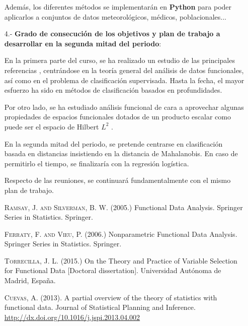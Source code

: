 \documentclass[a4paper,oneside,11pt,leqno]{article}
\begin{document}
\begin{enumerate}
            Además, los diferentes métodos se implementarán en \textbf{Python} para poder aplicarlos a conjuntos de datos meteorológicos,
            médicos, poblacionales...

      \item[4.-] {\bf Grado de consecución de los objetivos y plan de trabajo a desarrollar en la segunda mitad del periodo}:

            En la primera parte del curso, se ha realizado un estudio de las principales referencias \cite{Ramsay-Silverman, Ferraty-Vieu},
            centrándose en la teoría general del análisis de datos funcionales, así como en el problema de clasificación supervisada.
            Hasta la fecha, el mayor esfuerzo ha sido en métodos de clasificación basados en profundidades.

            Por otro lado, se ha estudiado análisis funcional de cara a aprovechar algunas propiedades de espacios funcionales dotados
            de un producto escalar como puede ser el espacio de Hilbert $L^2$ \cite{papa-Rudin}.

            En la segunda mitad del periodo, se pretende centrarse en clasificación basada en distancias insistiendo en
            la distancia de Mahalanobis. En caso de permitirlo el tiempo, se finalizaría con la regresión logística.

            Respecto de las reuniones, se continuará fundamentalmente con el mismo plan de trabajo.

            \begin{thebibliography}{10}

                  \textsc{Ramsay, J. and Silverman, B. W.} (2005.) Functional Data Analysis.
                  Springer Series in Statistics. Springer.

                  \textsc{Ferraty, F. and Vieu, P.} (2006.) Nonparametric Functional Data Analysis.
                  Springer Series in Statistics. Springer.

                  \textsc{Torrecilla, J. L.} (2015.) On the Theory and Practice of Variable
                  Selection for Functional Data [Doctoral dissertation]. Universidad Autónoma de Madrid, España.

                  \textsc{Cuevas, A.} (2013). A partial overview of the theory of statistics with functional data.
                  Journal of Statistical Planning and Inference. \url{http://dx.doi.org/10.1016/j.jspi.2013.04.002}


\end{thebibliography}
\end{enumerate}
\end{document}
